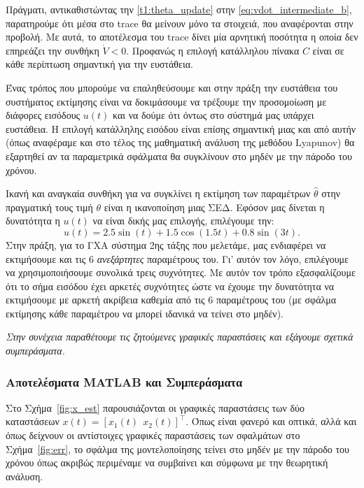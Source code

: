 \documentclass[12pt]{article} %
\numberwithin{equation}{section}  %
\begin{document}
Πράγματι, αντικαθιστώντας την \eqref{t1:theta_update} στην \eqref{eq:vdot_intermediate_b}, παρατηρούμε ότι μέσα στο trace θα μείνουν μόνο τα στοιχειά, που αναφέρονται στην προβολή. 
Με αυτά, το αποτέλεσμα του trace δίνει μία αρνητική ποσότητα η οποία δεν επηρεάζει την συνθήκη $\dot{V} < 0$.
Προφανώς η επιλογή κατάλληλου πίνακα $C$ είναι σε κάθε περίπτωση σημαντική για την ευστάθεια.

Ένας τρόπος που μπορούμε να επαληθεύσουμε και στην πράξη την ευστάθεια του συστήματος εκτίμησης 
είναι να δοκιμάσουμε να τρέξουμε την προσομοίωση με διάφορες εισόδους $u(t)$ και να δούμε ότι όντως στο σύστημά μας υπάρχει ευστάθεια.
Η επιλογή κατάλληλης εισόδου είναι επίσης σημαντική μιας και από αυτήν (όπως αναφέραμε και στο τέλος της μαθηματική ανάλυση της μεθόδου Lyapunov)
θα εξαρτηθεί αν τα παραμετρικά σφάλματα θα συγκλίνουν στο μηδέν με την πάροδο του χρόνου.  

Ικανή και αναγκαία συνθήκη για να συγκλίνει η εκτίμηση των παραμέτρων $\hat\theta$ στην πραγματική τους τιμή $\theta$ είναι η ικανοποίηση μιας ΣΕΔ.
Εφόσον μας δίνεται η δυνατότητα η $u(t)$ να είναι δικής μας επιλογής, επιλέγουμε την:
\begin{equation}\label{t1:u}
    u(t) = 2.5  \sin(t) + 1.5  \cos(1.5 t) + 0.8  \sin(3 t).
\end{equation}
Στην πράξη, για το ΓΧΑ σύστημα 2ης τάξης που μελετάμε, μας ενδιαφέρει να εκτιμήσουμε και τις $6$ \textit{ανεξάρτητες} παραμέτρους του.
Γι' αυτόν τον λόγο, επιλέγουμε να χρησιμοποιήσουμε συνολικά τρεις συχνότητες.
Με αυτόν τον τρόπο εξασφαλίζουμε ότι το σήμα εισόδου έχει αρκετές συχνότητες ώστε να έχουμε την δυνατότητα να εκτιμήσουμε με αρκετή ακρίβεια καθεμία από τις $6$ παραμέτρους του (με σφάλμα εκτίμησης κάθε παραμέτρου να μπορεί ιδανικά να τείνει στο μηδέν). 


\begin{center}
    \textit{Στην συνέχεια παραθέτουμε τις ζητούμενες γραφικές παραστάσεις και εξάγουμε σχετικά συμπεράσματα.}
\end{center}



\subsubsection{Αποτελέσματα MATLAB και Συμπεράσματα}

Στο Σχήμα~\ref{fig:x_est} παρουσιάζονται οι γραφικές παραστάσεις των δύο καταστάσεων $x(t) = [x_1(t) \ \ x_2(t)]^{\top}$.
Όπως είναι φανερό και οπτικά, αλλά και όπως δείχνουν οι αντίστοιχες γραφικές παραστάσεις των σφαλμάτων στο Σχήμα~\ref{fig:err}, 
το σφάλμα της μοντελοποίησης τείνει στο μηδέν με την πάροδο του χρόνου\textemdash 
όπως ακριβώς περιμέναμε να συμβαίνει και σύμφωνα με την θεωρητική ανάλυση. 
\end{document}
